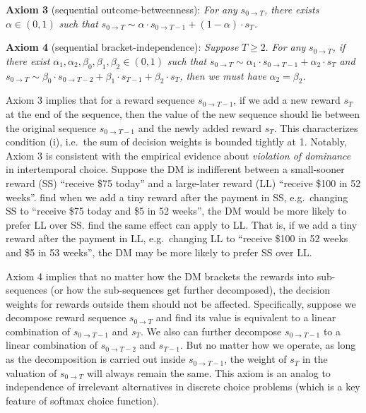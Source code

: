 \documentclass[
  12pt,
]{article}
\begin{document}
\noindent \textbf{Axiom 3} (sequential outcome-betweenness): \emph{For
any} \(s_{0\rightarrow T}\)\emph{, there exists} \(\alpha\in(0,1)\)
\emph{such that}
\(s_{0\rightarrow T} \sim \alpha\cdot s_{0\rightarrow T-1}+(1-\alpha) \cdot s_T\)\emph{.}

\noindent \textbf{Axiom 4} (sequential bracket-independence):
\emph{Suppose} \(T\geq 2\). \emph{For any} \(s_{0\rightarrow T}\)\emph{,
if there exist} \(\alpha_1,\alpha_2,\beta_0,\beta_1,\beta_2\in(0,1)\)
\emph{such that}
\(s_{0\rightarrow T}\sim \alpha_1 \cdot s_{0\rightarrow T-1} + \alpha_2 \cdot s_{T}\)
\emph{and}
\(s_{0\rightarrow T}\sim \beta_0 \cdot s_{0\rightarrow T-2}+\beta_1 \cdot s_{T-1}+\beta_2 \cdot s_{T}\)\emph{,
then we must have} \(\alpha_2 = \beta_2\)\emph{.}

Axiom 3 implies that for a reward sequence \(s_{0\rightarrow T-1}\), if
we add a new reward \(s_T\) at the end of the sequence, then the value
of the new sequence should lie between the original sequence
\(s_{0\rightarrow T-1}\) and the newly added reward \(s_T\). This
characterizes condition (i), i.e.~the sum of decision weights is bounded
tightly at 1. Notably, Axiom 3 is consistent with the empirical evidence
about \emph{violation of dominance}
\citep{scholten2014better, jiang2017better} in intertemporal choice.
Suppose the DM is indifferent between a small-sooner reward (SS)
``receive \$75 today'' and a large-later reward (LL) ``receive \$100 in
52 weeks''. \citet{scholten2014better} find when we add a tiny reward
after the payment in SS, e.g.~changing SS to ``receive \$75 today and
\$5 in 52 weeks'', the DM would be more likely to prefer LL over SS.
\citet{jiang2017better} find the same effect can apply to LL. That is,
if we add a tiny reward after the payment in LL, e.g.~changing LL to
``receive \$100 in 52 weeks and \$5 in 53 weeks'', the DM may be more
likely to prefer SS over LL.

Axiom 4 implies that no matter how the DM brackets the rewards into
sub-sequences (or how the sub-sequences get further decomposed), the
decision weights for rewards outside them should not be affected.
Specifically, suppose we decompose reward sequence
\(s_{0\rightarrow T}\) and find its value is equivalent to a linear
combination of \(s_{0\rightarrow T-1}\) and \(s_T\). We also can further
decompose \(s_{0\rightarrow T-1}\) to a linear combination of
\(s_{0\rightarrow T-2}\) and \(s_{T-1}\). But no matter how we operate,
as long as the decomposition is carried out inside
\(s_{0\rightarrow T-1}\), the weight of \(s_T\) in the valuation of
\(s_{0\rightarrow T}\) will always remain the same. This axiom is an
analog to independence of irrelevant alternatives in discrete choice
problems (which is a key feature of softmax choice function).
\end{document}

